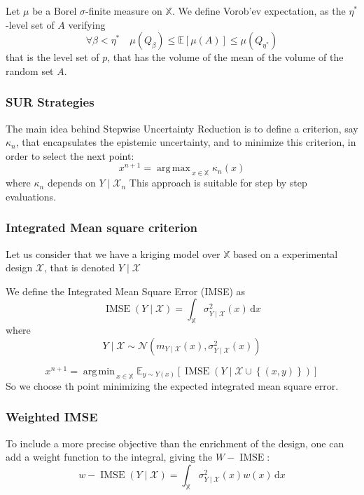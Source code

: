\documentclass[a4paper,11pt]{article}
\newcommand{\Ex}{\mathbb{E}}
\newcommand{\Xspace}{\mathbb{X}}
\DeclareMathOperator*{\argmin}{arg\,min \,}
\DeclareMathOperator*{\argmax}{arg\,max \,}
\DeclareMathOperator{\IMSE}{IMSE}
\begin{document}
Let $\mu$ be a Borel $\sigma$-finite measure on $\Xspace$. We define Vorob'ev expectation, as the $\eta^*$-level set of $A$ verifying
\begin{equation}
  \forall \beta < \eta^* \quad \mu(Q_{\beta}) \leq \Ex[\mu(A)] \leq \mu(Q_{\eta^*})
\end{equation}
that is the level set of $p$, that has the volume of the mean of the volume of the random set $A$.

\subsubsection{SUR Strategies}
The main idea behind Stepwise Uncertainty Reduction is to define a criterion, say $\kappa_n$, that encapsulates the epistemic uncertainty, and to minimize this criterion, in order to select the next point:
\begin{equation}
  x^{n+1} = \argmax_{x\in\Xspace} \kappa_n(x)
\end{equation}
where $\kappa_n$ depends on $Y\mid \mathcal{X}_n$
This approach is suitable for step by step evaluations.

\subsubsection{Integrated Mean square criterion}
\cite{sacks_designs_1989}
Let us consider that we have a kriging model over $\Xspace$ based on a experimental design $\mathcal{X}$, that is denoted $Y \mid \mathcal{X}$

We define the Integrated Mean Square Error (IMSE) as
\begin{equation}
  \IMSE(Y \mid \mathcal{X}) = \int_{\Xspace} \sigma_{Y\mid\mathcal{X}}^2(x)\,\mathrm{d}x
\end{equation}
where
\begin{equation}
  Y\mid \mathcal{X} \sim \mathcal{N}(m_{Y\mid\mathcal{X}}(x),\sigma^2_{Y\mid\mathcal{X}}(x))
\end{equation}


\begin{equation}
  x^{n+1} = \argmin_{x\in \Xspace}\Ex_{y\sim Y(x)}\left[\IMSE\left(Y \mid \mathcal{X}\cup \left\{(x, y)\right\}\right) \right]
\end{equation}
So we choose th point minimizing the expected integrated mean square error.

\subsubsection{Weighted IMSE}
To include a more precise objective than the enrichment of the design, one can add a weight function to the integral, giving the $W-\IMSE$:
\begin{equation}
  \label{eq:w-imse}
  w-\IMSE(Y\mid \mathcal{X}) = \int_{\Xspace} \sigma_{Y\mid\mathcal{X}}^2(x)w(x)\,\mathrm{d}x
\end{equation}
\end{document}
